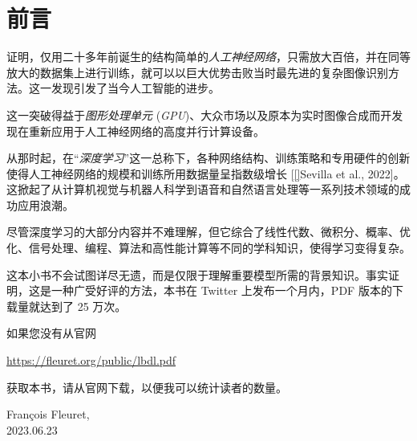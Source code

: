\documentclass[oneside,11pt]{memoir}
\begin{document}
\newpage


{
\everymath{\color{black}}
\tableofcontents %
}

\clearpage

\listoffigures*
{}


\chapter*{前言}

\cite{nips-1502.c399862d3b9d6b76c8436e924a68c45b} 证明，仅用二十多年前\citep{lecun-89e}诞生的结构简单的\emph{人工神经网络}，只需放大百倍，并在同等放大的数据集上进行训练，就可以以巨大优势击败当时最先进的复杂图像识别方法。这一发现引发了当今人工智能的进步。

这一突破得益于\emph{图形处理单元} (\emph{GPU})、大众市场以及原本为实时图像合成而开发现在重新应用于人工神经网络的高度并行计算设备。

从那时起，在``\emph{深度学习}''这一总称下，各种网络结构、训练策略和专用硬件的创新使得人工神经网络的规模和训练所用数据量呈指数级增长 [\ref{}{Sevilla et al., 2022}]。这掀起了从计算机视觉与机器人科学到语音和自然语言处理等一系列技术领域的成功应用浪潮。

尽管深度学习的大部分内容并不难理解，但它综合了线性代数、微积分、概率、优化、信号处理、编程、算法和高性能计算等不同的学科知识，使得学习变得复杂。

这本小书不会试图详尽无遗，而是仅限于理解重要模型所需的背景知识。事实证明，这是一种广受好评的方法，本书在 Twitter 上发布一个月内，PDF 版本的下载量就达到了 25 万次。

如果您没有从官网 
\begin{center}
\href{https://fleuret.org/public/lbdl.pdf}{https://fleuret.org/public/lbdl.pdf}
\end{center}
获取本书，请从官网下载，以便我可以统计读者的数量。

\begin{flushright}
  François Fleuret,\\
  2023.06.23
\end{flushright}
\end{document}
